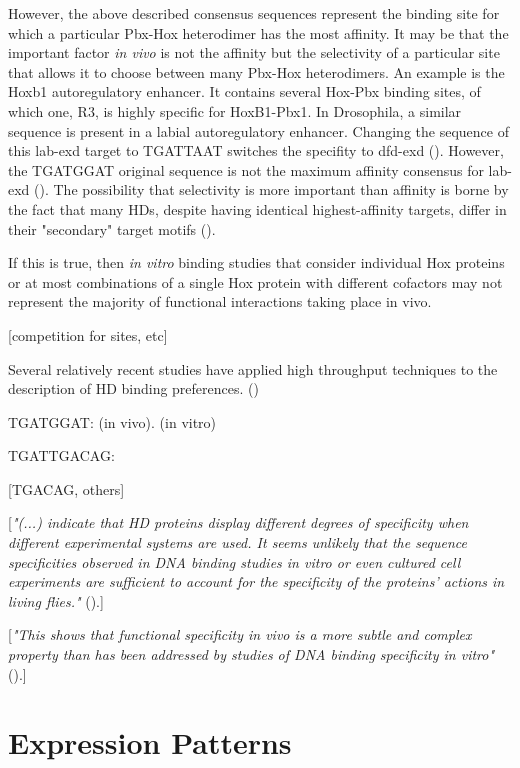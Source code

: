 However, the above described consensus sequences represent the binding site for which a particular Pbx-Hox heterodimer has the most affinity. It may be that the important factor \textit{in vivo} is not the affinity but the selectivity of a particular site that allows it to choose between many Pbx-Hox heterodimers. An example is the Hoxb1 autoregulatory enhancer. It contains several Hox-Pbx binding sites, of which one, R3, is highly specific for HoxB1-Pbx1. In Drosophila, a similar sequence is present in a labial autoregulatory enhancer. Changing the sequence of this lab-\ac{exd} target to TGATTAAT switches the specifity to dfd-\ac{exd} (\cite{Chan1997}). However, the TGATGGAT original sequence is not the maximum affinity consensus for lab-\ac{exd} (\cite{Mann1998,Shen1997}). The possibility that selectivity is more important than affinity is borne by the fact that many \acp{HD}, despite having identical highest-affinity targets, differ in their "secondary" target motifs (\cite{Berger2008}).

If this is true, then \textit{in vitro} binding studies that consider individual Hox proteins or at most combinations of a single Hox protein with different cofactors may not represent the majority of functional interactions taking place in vivo. 

[competition for sites, etc]
		
Several relatively recent studies have applied high throughput techniques to the description of \ac{HD} binding preferences. (\cite{Slattery2011,Berger2008,Noyes2008})
		
TGATGGAT: \cite{Poepperl1995,Chan1997} (in vivo). \cite{Chang1997} (in vitro)

TGATTGACAG: \cite{Knoepfler1997}

[TGACAG, others]

[\textit{"(...) indicate that \ac{HD} proteins display different degrees of specificity when different experimental systems are used. It seems unlikely that the sequence specificities observed in DNA binding studies in vitro or even cultured cell experiments are sufficient to account for the specificity of the proteins’ actions in living flies."} (\cite{Hayashi1990}).]

[\textit{"This shows that functional specificity in vivo is a more subtle and complex property than has been addressed by studies of DNA binding specificity in vitro"} (\cite{Treisman1992}).]



\section{Expression Patterns}

